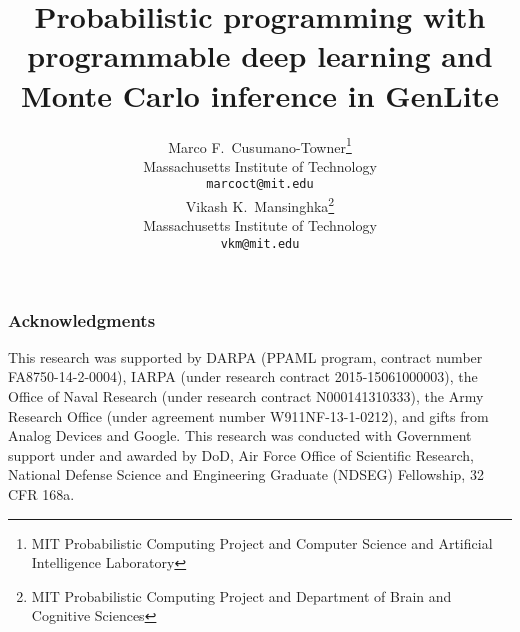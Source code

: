 \documentclass{article}
\title{Probabilistic programming with programmable deep learning and Monte Carlo inference in GenLite}
\author{
  Marco F.~Cusumano-Towner\thanks{MIT Probabilistic Computing Project and Computer Science and Artificial Intelligence Laboratory}\\
  Massachusetts Institute of Technology\\
  \texttt{marcoct@mit.edu} \\
  \And
  Vikash K.~Mansinghka\thanks{MIT Probabilistic Computing Project and Department of Brain and Cognitive Sciences}\\
  Massachusetts Institute of Technology\\
  \texttt{vkm@mit.edu}
}
\begin{document}
\maketitle
\setcounter{footnote}{0}










\subsubsection*{Acknowledgments}
This research was supported by DARPA (PPAML program, contract number FA8750-14-2-0004), IARPA (under research contract 2015-15061000003), the Office of Naval Research (under research contract N000141310333), the Army Research Office (under agreement number W911NF-13-1-0212), and gifts from Analog Devices and Google.
This research was conducted with Government support under and awarded by DoD, Air Force Office of Scientific Research, National Defense Science and Engineering Graduate (NDSEG) Fellowship, 32 CFR 168a.



\end{document}

